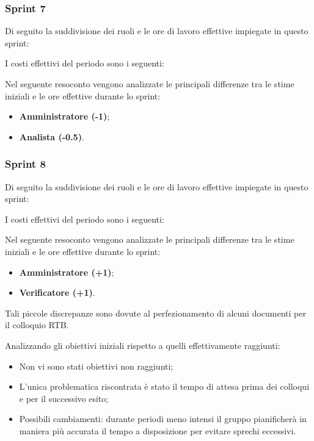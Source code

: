 \pagebreak
\subsubsection{Sprint 7}
Di seguito la suddivisione dei ruoli e le ore di lavoro effettive impiegate in
questo sprint:



I costi effettivi del periodo sono i seguenti:



Nel seguente resoconto vengono analizzate le principali differenze tra le stime iniziali e le ore effettive durante lo sprint:
\begin{itemize}
    \item \textbf{Amministratore (-1)}; 
    \item \textbf{Analista (-0.5)}.
\end{itemize}



\subsubsection{Sprint 8}
Di seguito la suddivisione dei ruoli e le ore di lavoro effettive impiegate in questo sprint:



I costi effettivi del periodo sono i seguenti:



Nel seguente resoconto vengono analizzate le principali differenze tra le stime iniziali e le ore effettive durante lo sprint:
\begin{itemize}
    \item \textbf{Amministratore (+1)}; 
    \item \textbf{Verificatore (+1)}.
\end{itemize}
Tali piccole discrepanze sono dovute al perfezionamento di alcuni documenti per il colloquio RTB.


Analizzando gli obiettivi iniziali rispetto a quelli effettivamente raggiunti:
\begin{itemize}
    \item Non vi sono stati obiettivi non raggiunti; 
    \item L'unica problematica riscontrata è stato il tempo di attesa prima dei colloqui e per il successivo esito;
    \item Possibili cambiamenti: durante periodi meno intensi il gruppo pianificherà in maniera più accurata il tempo a disposizione per evitare sprechi eccessivi.
\end{itemize}
\pagebreak

